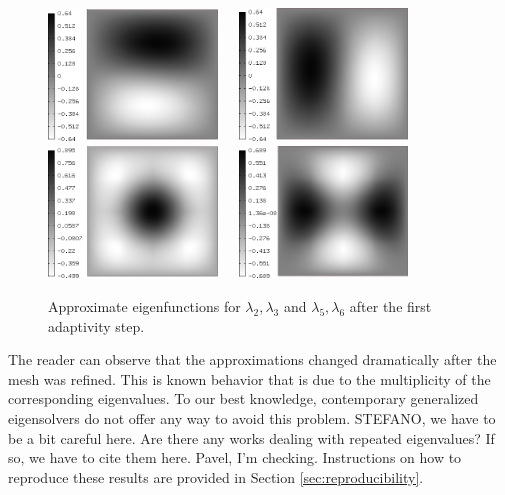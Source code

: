 \documentclass[preprint,12pt]{elsarticle}
\begin{document}
\clearpage
\begin{figure}[!ht]
\begin{center}
\includegraphics[width=0.4\textwidth]{img/eigen_5.png}\ \ \ 
\includegraphics[width=0.4\textwidth]{img/eigen_6.png}\\[4mm]
\includegraphics[width=0.4\textwidth]{img/eigen_7.png}\ \ \ 
\includegraphics[width=0.4\textwidth]{img/eigen_8.png}\\
\end{center}
\vspace{-5mm}
\caption{Approximate eigenfunctions for $\lambda_2, \lambda_3$ and 
$\lambda_5, \lambda_6$ after the first adaptivity step.}
\label{fig:eigen2}
\end{figure}

The reader can observe that the approximations changed dramatically after the 
mesh was refined. This is known behavior that is due to the multiplicity of the 
corresponding eigenvalues. To our best knowledge, contemporary generalized 
eigensolvers do not offer any way to avoid this problem. 
{\red STEFANO, we have to be a bit careful here. Are there any works dealing 
with repeated eigenvalues? If so, we have to cite them here.} {\red Pavel, I'm checking.}
Instructions on how to reproduce 
these results are provided in Section \ref{sec:reproducibility}.
\end{document}
